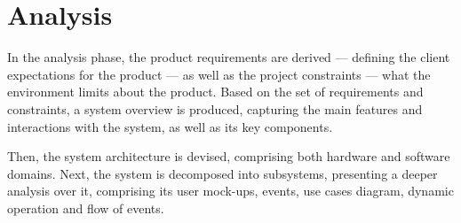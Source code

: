 \chapter{Analysis}
\label{ch:analysis}
In the analysis phase, the product requirements are derived --- defining the client expectations
for the product --- as well as the project constraints --- what the environment
limits about the product. Based on the set of requirements and constraints, a
system overview is produced, capturing the main features and interactions with
the system, as well as its key components.

Then, the system architecture is
devised, comprising both hardware and software domains. Next, the system is
decomposed into subsystems, presenting a deeper analysis over it, comprising its
user mock-ups, events, use cases diagram, dynamic operation and flow of events.
%





% 
% 
%
